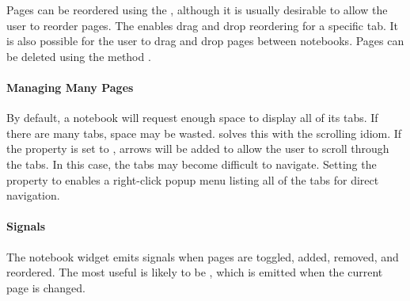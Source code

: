 Pages can be reordered using the ,
although it is usually desirable to allow the user to reorder
pages. The  enables drag and
drop reordering for a specific tab. It is also possible for the user
to drag and drop pages between notebooks. Pages can be deleted using
the method .

\paragraph{Managing Many Pages}

By default, a notebook will request enough space to display all of its
tabs. If there are many tabs, space may be wasted. 
solves this with the scrolling idiom. If the
property  is set to , arrows will be added
to allow the user to scroll through the tabs. In this case, the tabs
may become difficult to navigate. Setting the 
property to  enables a right-click popup menu listing all
of the tabs for direct navigation.

\paragraph{Signals}

The notebook widget emits signals when pages are toggled, added,
removed, and reordered. The most useful is likely to be
, which is emitted when the current page is
changed.

